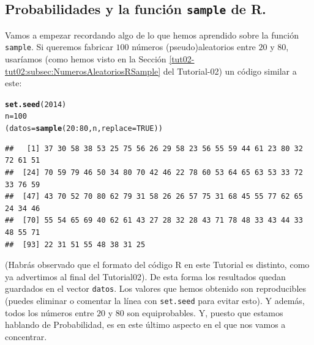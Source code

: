 \documentclass[10pt,a4paper]{article}\usepackage[]{graphicx}\usepackage[]{color}
\makeatletter
\newcommand{\hlnum}[1]{\textcolor[rgb]{0.686,0.059,0.569}{#1}}%
\newcommand{\hlopt}[1]{\textcolor[rgb]{0,0,0}{#1}}%
\newcommand{\hlstd}[1]{\textcolor[rgb]{0.345,0.345,0.345}{#1}}%
\newcommand{\hlkwb}[1]{\textcolor[rgb]{0.69,0.353,0.396}{#1}}%
\newcommand{\hlkwc}[1]{\textcolor[rgb]{0.333,0.667,0.333}{#1}}%
\newcommand{\hlkwd}[1]{\textcolor[rgb]{0.737,0.353,0.396}{\textbf{#1}}}%
\newenvironment{kframe}{%
 \def\at@end@of@kframe{}%
 \ifinner\ifhmode%
  \def\at@end@of@kframe{\end{minipage}}%
  \begin{minipage}{\columnwidth}%
 \fi\fi%
 \def\FrameCommand##1{\hskip\@totalleftmargin \hskip-\fboxsep
 \colorbox{shadecolor}{##1}\hskip-\fboxsep
     \hskip-\linewidth \hskip-\@totalleftmargin \hskip\columnwidth}%
 \MakeFramed {\advance\hsize-\width
   \@totalleftmargin\z@ \linewidth\hsize
   \@setminipage}}%
 {\par\unskip\endMakeFramed%
 \at@end@of@kframe}
\newenvironment{knitrout}{}{} %
\makeatother
\begin{document}
\subsection{Probabilidades y la función {\tt sample} de R.}

Vamos a empezar recordando algo de lo que hemos aprendido sobre la función {\tt sample}. Si queremos fabricar $100$ números (pseudo)aleatorios entre $20$ y $80$, usaríamos (como hemos visto en la Sección \ref{tut02-tut02:subsec:NumerosAleatoriosRSample} del Tutorial-02) un código similar a este:
\begin{knitrout}
\color{fgcolor}\begin{kframe}
\begin{alltt}
\hlkwd{set.seed}\hlstd{(}\hlnum{2014}\hlstd{)}
\hlstd{n}\hlkwb{=}\hlnum{100}
\hlstd{(datos} \hlkwb{=} \hlkwd{sample}\hlstd{(}\hlnum{20}\hlopt{:}\hlnum{80}\hlstd{, n,} \hlkwc{replace}\hlstd{=}\hlnum{TRUE}\hlstd{))}
\end{alltt}
\begin{verbatim}
##   [1] 37 30 58 38 53 25 75 56 26 29 58 23 56 55 59 44 61 23 80 32 72 61 51
##  [24] 70 59 79 46 50 34 80 70 42 46 22 78 60 53 64 65 63 53 33 72 33 76 59
##  [47] 43 70 52 70 80 62 79 31 58 26 26 57 75 31 68 45 55 77 62 65 24 34 46
##  [70] 55 54 65 69 40 62 61 43 27 28 32 28 43 71 78 48 33 43 44 33 48 55 71
##  [93] 22 31 51 55 48 38 31 25
\end{verbatim}
\end{kframe}
\end{knitrout}
     (Habrás observado que el formato del código R en este Tutorial es distinto, como ya advertimos al final  del Tutorial02). De esta forma los resultados quedan guardados en el vector {\tt datos}. Los valores que hemos obtenido son reproducibles (puedes eliminar o comentar la línea con {\tt set.seed} para evitar esto). Y además, todos los números entre $20$ y $80$ son equiprobables. Y, puesto que estamos hablando de Probabilidad, es en este último aspecto en el que nos vamos a concentrar.
\end{document}

